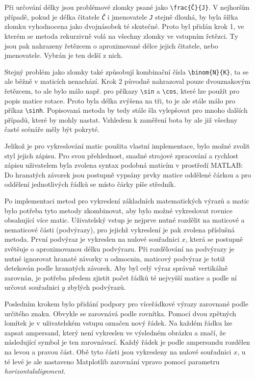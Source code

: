\documentclass[FM]{tulthesis}
\begin{document}
	Při určování délky jsou problémové zlomky psané jako \verb|\frac{Č}{J}|. V nejhorším případě, pokud je délka čitatele \textit{\texttt{Č}} i jmenovatele \textit{\texttt{J}} stejně dlouhá, by byla šířka zlomku vyhodnocena jako dvojnásobek té skutečné. Proto byl přidán krok 1, ve kterém se metoda rekurzivně volá na všechny zlomky ve vstupním řetězci. Ty jsou pak nahrazeny řetězcem o aproximované délce jejich čitatele, nebo jmenovatele. Vybrán je ten delší z nich.

	Stejný problém jako zlomky také způsobují kombinační čísla \verb|\binom{N}{K}|, ta se ale běžně v maticích nenachází. Krok 2 původně nahrazoval pouze dvouznakovým řetězcem, to ale bylo málo např. pro příkazy \verb|\sin| a \verb|\cos|, které lze použít pro popis matice rotace. Proto byla délka zvýšena na tři, to je ale stále málo pro příkaz \verb|\sinh|. Popisovaná metoda by tedy stále šla vylepšovat pro mnoho dalších případů, které by mohly nastat. Vzhledem k zaměření bota by ale již všechny časté scénáře měly být pokryté.

	Jelikož je pro vykreslování matic použita vlastní implementace, bylo možné zvolit styl jejich zápisu. Pro svou přehlednost, snadné strojové zpracování a rychlost zápisu uživatelem byla zvolena syntax podobná maticím v prostředí MATLAB: Do hranatých závorek jsou postupně vypsány prvky matice oddělené čárkou a pro oddělení jednotlivých řádků se místo čárky píše středník.

	Po implementaci metod pro vykreslení základních matematických výrazů a matic bylo potřeba tyto metody zkombinovat, aby bylo možné vykreslovat rovnice obsahující více matic. Uživatelský vstup je nejprve nutné rozdělit na maticové a nematicové části (podvýrazy), pro jejichž vykreslení je pak zvolena příslušná metoda. První podvýraz je vykreslen na nulové souřadnici $x$, která se postupně zvětšuje o aproximovanou délku podvýrazu. Při rozdělování na podvýrazy je nutné ignorovat hranaté závorky u odmocnin, maticový podvýraz je totiž detekován podle hranatých závorek. Aby byl celý výraz správně vertikálně zarovnán, je potřeba předem zjistit počet řádků té nejvyšší matice a podle ní určovat souřadnici $y$ zbylých podvýrazů.
	
	Posledním krokem bylo přidání podpory pro víceřádkové výrazy zarovnané podle určitého znaku. Obvykle se zarovnává podle rovnítka. Pomocí dvou zpětných lomítek je v uživatelském vstupu označen nový řádek. Na každém řádku lze zapsat ampersand, který není vykreslen ve výsledném obrázku a značí, že následující symbol je ten zarovnávací. Každý řádek je podle ampersandu rozdělen na levou a pravou část. Obě tyto části jsou vykresleny na nulové souřadnici $x$, u té levé je ale nastaveno Matplotlib zarovnání vpravo pomocí parametru \textit{horizontalalignment}.
	
\end{document}
